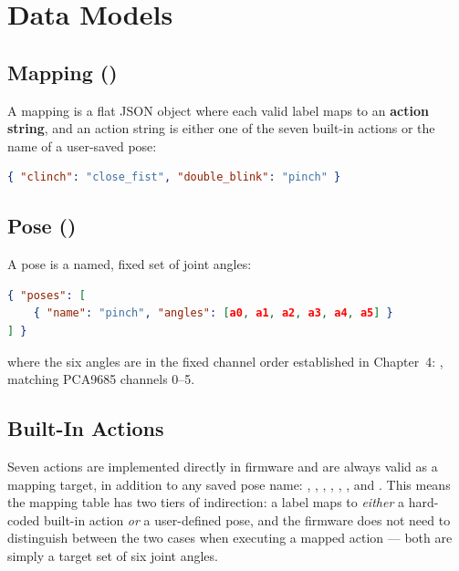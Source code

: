 \section{Data Models}
\label{sec:app_datamodels}

\subsection{Mapping ()}

A mapping is a flat JSON object where each valid label maps to an
\textbf{action string}, and an action string is either one of the
seven built-in actions or the name of a user-saved pose:

\begin{lstlisting}[language=json,
    caption={Mapping data model.}, label={lst:mapping_model}]
{ "clinch": "close_fist", "double_blink": "pinch" }
\end{lstlisting}

\subsection{Pose ()}

A pose is a named, fixed set of joint angles:

\begin{lstlisting}[language=json,
    caption={Pose data model. \texttt{angles} always has exactly 6
    entries, 0--180 degrees, in channel order.},
    label={lst:pose_model}]
{ "poses": [
    { "name": "pinch", "angles": [a0, a1, a2, a3, a4, a5] }
] }
\end{lstlisting}

\noindent where the six angles are in the fixed channel order
established in Chapter~4: , matching PCA9685 channels 0--5.

\subsection{Built-In Actions}

Seven actions are implemented directly in firmware and are always
valid as a mapping target, in addition to any saved pose name:
, , , ,
, , and . This
means the mapping table has two tiers of indirection: a label maps
to \emph{either} a hard-coded built-in action \emph{or} a
user-defined pose, and the firmware does not need to distinguish
between the two cases when executing a mapped action --- both are
simply a target set of six joint angles.

